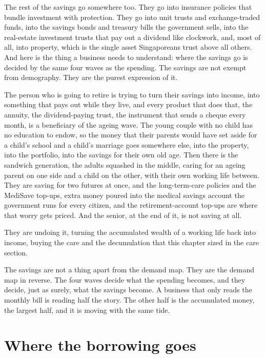 \documentclass[10pt,twoside,openany]{memoir}
\newcommand{\needspacehead}{\needspace{4\baselineskip}}
\let\oldsection\section
\renewcommand{\section}{\needspacehead\oldsection}
\begin{document}
{{{{{{{{{{{{{{{{{The rest of the savings go somewhere too. They go into insurance
policies that bundle investment with protection. They go into unit
trusts and exchange-traded funds, into the savings bonds and treasury
bills the government sells, into the real-estate investment trusts that
pay out a dividend like clockwork, and, most of all, into property,
which is the single asset Singaporeans trust above all others. And here
is the thing a business needs to understand: where the savings go is
decided by the same four waves as the spending. The savings are not
exempt from demography. They are the purest expression of it.

The person who is going to retire is trying to turn their savings into
income, into something that pays out while they live, and every product
that does that, the annuity, the dividend-paying trust, the instrument
that sends a cheque every month, is a beneficiary of the ageing wave.
The young couple with no child has no education to endow, so the money
that their parents would have set aside for a child's school and a
child's marriage goes somewhere else, into the property, into the
portfolio, into the savings for their own old age. Then there is the
sandwich generation, the adults squashed in the middle, caring for an
ageing parent on one side and a child on the other, with their own
working life between. They are saving for two futures at once, and the
long-term-care policies and the MediSave top-ups, extra money poured
into the medical savings account the government runs for every citizen,
and the retirement-account top-ups are where that worry gets priced. And
the senior, at the end of it, is not saving at all.

They are undoing it, turning the accumulated wealth of a working life
back into income, buying the care and the decumulation that this chapter
sized in the care section.

The savings are not a thing apart from the demand map. They are the
demand map in reverse. The four waves decide what the spending becomes,
and they decide, just as surely, what the savings become. A business
that only reads the monthly bill is reading half the story. The other
half is the accumulated money, the largest half, and it is moving with
the same tide.

\section{Where the borrowing goes}\label{where-the-borrowing-goes}

}}}}}}}}}}}}}}}}}
\end{document}
